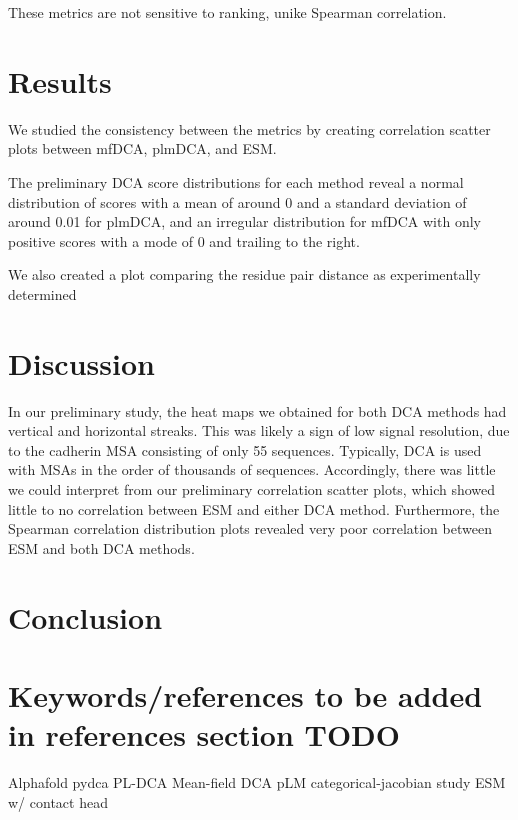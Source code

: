 \documentclass{article}
\begin{document}
These metrics are not sensitive to ranking, unike Spearman correlation. 


\noindent 
\section{Results}

We studied the consistency between the metrics by creating correlation scatter plots between mfDCA, plmDCA, and ESM.

The preliminary DCA score distributions for each method reveal a normal distribution of scores with a mean of around 0 and a standard deviation of around 0.01 for plmDCA, and an irregular distribution for mfDCA with only positive scores with a mode of 0 and trailing to the right. 

We also created a plot comparing the residue pair distance as experimentally determined 

\section{Discussion}

In our preliminary study, the heat maps we obtained for both DCA methods had vertical and horizontal streaks. This was likely a sign of low signal resolution, due to the cadherin MSA consisting of only 55 sequences. Typically, DCA is used with MSAs in the order of thousands of sequences. Accordingly, there was little we could interpret from our preliminary correlation scatter plots, which showed little to no correlation between ESM and either DCA method. Furthermore, the Spearman correlation distribution plots revealed very poor correlation between ESM and both DCA methods. 



\section{Conclusion}

\section{Keywords/references to be added in references section TODO}
Alphafold \cite{AlphaFold}
pydca \cite{pydca}
PL-DCA \cite{Ekeberg}
Mean-field DCA \cite{Morcos}
pLM categorical-jacobian study \cite{Zhang}
ESM w/ contact head \cite{ESMContactHead}



\end{document}
